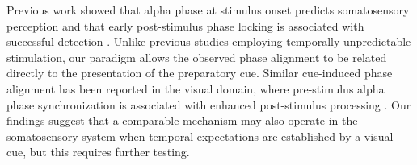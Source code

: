 \documentclass[11pt,a4paper,onecolumn]{article}
\begin{document}
Previous work showed that alpha phase at stimulus onset predicts somatosensory perception \cite{aiPhasePrestimulusAlpha2014} and that early post-stimulus phase locking is associated with successful detection \cite{palvaEarlyNeuralCorrelates2005}. 
Unlike previous studies employing temporally unpredictable stimulation, our paradigm allows the observed phase alignment to be related directly to the presentation of the preparatory cue.
Similar cue-induced phase alignment has been reported in the visual domain, where pre-stimulus alpha phase synchronization is associated with enhanced post-stimulus processing \cite{fellingerPrestimulusAlphaPhasealignment2011}. Our findings suggest that a comparable mechanism may also operate in the somatosensory system when temporal expectations are established by a visual cue, but this requires further testing. 
\end{document}
